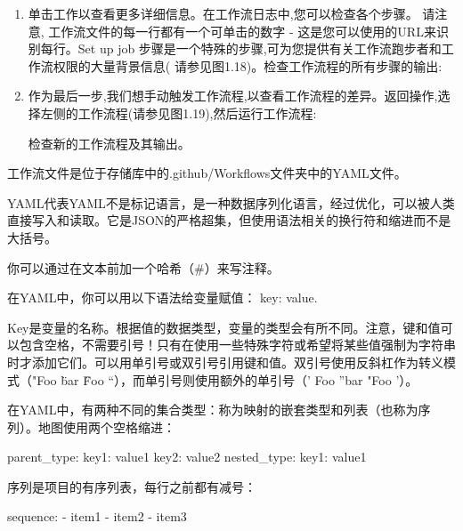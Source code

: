 \begin{enumerate}
\item 
单击工作以查看更多详细信息。在工作流日志中,您可以检查各个步骤。 请注意, 工作流文件的每一行都有一个可单击的数字 - 这是您可以使用的URL来识别每行。Set up job 步骤是一个特殊的步骤,可为您提供有关工作流跑步者和工作流权限的大量背景信息( 请参见图1.18)。检查工作流程的所有步骤的输出:


\item 
作为最后一步,我们想手动触发工作流程,以查看工作流程的差异。返回操作,选择左侧的工作流程(请参见图1.19),然后运行工作流程:


检查新的工作流程及其输出。

\end{enumerate}


工作流文件是位于存储库中的.github/Workflows文件夹中的YAML文件。


YAML代表YAML不是标记语言，是一种数据序列化语言，经过优化，可以被人类直接写入和读取。它是JSON的严格超集，但使用语法相关的换行符和缩进而不是大括号。

你可以通过在文本前加一个哈希（\#）来写注释。

在YAML中，你可以用以下语法给变量赋值： key: value.

Key是变量的名称。根据值的数据类型，变量的类型会有所不同。注意，键和值可以包含空格，不需要引号！只有在使用一些特殊字符或希望将某些值强制为字符串时才添加它们。可以用单引号或双引号引用键和值。双引号使用反斜杠作为转义模式（"Foo \"bar \" Foo “），而单引号则使用额外的单引号（' Foo ”bar "Foo '）。


在YAML中，有两种不同的集合类型：称为映射的嵌套类型和列表（也称为序列）。地图使用两个空格缩进：

\begin{shell}
parent_type:
  key1: value1
  key2: value2
  nested_type:
    key1: value1
\end{shell}

序列是项目的有序列表，每行之前都有减号：

\begin{shell}
sequence:
  - item1
  - item2
  - item3
\end{shell}

